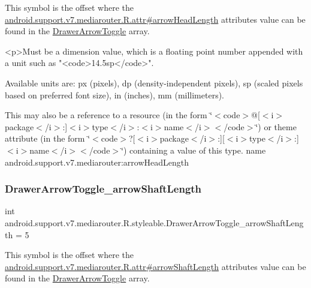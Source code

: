This symbol is the offset where the \hyperlink{classandroid_1_1support_1_1v7_1_1mediarouter_1_1R_1_1attr_afd1b5286a8e70d08caaf90c36566c9e3}{android.\+support.\+v7.\+mediarouter.\+R.\+attr\#arrow\+Head\+Length} attribute\textquotesingle{}s value can be found in the \hyperlink{classandroid_1_1support_1_1v7_1_1mediarouter_1_1R_1_1styleable_a71030bdd9f81aafe32f56767ba04e5b0}{Drawer\+Arrow\+Toggle} array.

\begin{DoxyVerb}      <p>Must be a dimension value, which is a floating point number appended with a unit such as "<code>14.5sp</code>".
\end{DoxyVerb}
 Available units are\+: px (pixels), dp (density-\/independent pixels), sp (scaled pixels based on preferred font size), in (inches), mm (millimeters). 

This may also be a reference to a resource (in the form \char`\"{}$<$code$>$@\mbox{[}$<$i$>$package$<$/i$>$\+:\mbox{]}$<$i$>$type$<$/i$>$\+:$<$i$>$name$<$/i$>$$<$/code$>$\char`\"{}) or theme attribute (in the form \char`\"{}$<$code$>$?\mbox{[}$<$i$>$package$<$/i$>$\+:\mbox{]}\mbox{[}$<$i$>$type$<$/i$>$\+:\mbox{]}$<$i$>$name$<$/i$>$$<$/code$>$\char`\"{}) containing a value of this type.  name android.\+support.\+v7.\+mediarouter\+:arrow\+Head\+Length \mbox{\label{classandroid_1_1support_1_1v7_1_1mediarouter_1_1R_1_1styleable_a0372ce9b69df23ee04c3dbddd6e5ddd3}} 
\subsubsection{\texorpdfstring{Drawer\+Arrow\+Toggle\+\_\+arrow\+Shaft\+Length}{DrawerArrowToggle\_arrowShaftLength}}
{\footnotesize\ttfamily int android.\+support.\+v7.\+mediarouter.\+R.\+styleable.\+Drawer\+Arrow\+Toggle\+\_\+arrow\+Shaft\+Length = 5\hspace{0.3cm}{\ttfamily [static]}}

This symbol is the offset where the \hyperlink{classandroid_1_1support_1_1v7_1_1mediarouter_1_1R_1_1attr_a77de6186fb5c3e3ca0a06c6cf0059954}{android.\+support.\+v7.\+mediarouter.\+R.\+attr\#arrow\+Shaft\+Length} attribute\textquotesingle{}s value can be found in the \hyperlink{classandroid_1_1support_1_1v7_1_1mediarouter_1_1R_1_1styleable_a71030bdd9f81aafe32f56767ba04e5b0}{Drawer\+Arrow\+Toggle} array.

